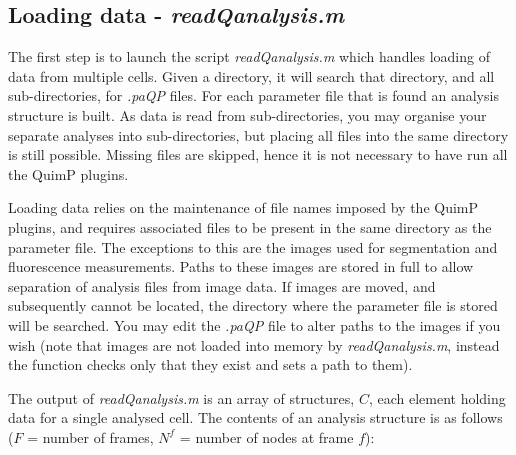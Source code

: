 \documentclass[a4paper,12pt]{article}
\begin{document}
\subsection{Loading data - \textit{readQanalysis.m}  }

The first step is to launch the script \textit{readQanalysis.m} which handles loading of data from multiple
cells.  Given a directory, it will search that directory, and all sub-directories, for \textit{.paQP} files. For each parameter file
that is found an analysis structure is built.  As data is read from sub-directories, you may organise your separate analyses into 
sub-directories, but placing all files into the same directory is still possible. Missing files are skipped, hence it is not necessary
to have run all the QuimP plugins.


Loading data relies on the maintenance
of file names imposed by the QuimP plugins, and requires associated files to
be present in the same directory as the parameter file.
The exceptions to this are the images used for segmentation and fluorescence measurements.  Paths to these images are
stored in full to allow separation of analysis files from image data.  If images are moved, and subsequently cannot
be located, the directory where the parameter file is stored will be searched.  You may edit the \textit{.paQP} file to alter
paths to the images if you wish
(note that images are not loaded into memory by \textit{readQanalysis.m}, instead the function checks only that they exist
and sets a path to them).

The output of \textit{readQanalysis.m} is an array of structures, $C$, each element holding data for a single analysed cell.
The contents of an analysis structure is as follows ($F$ = number of frames, $N^{f}$ = number of nodes at frame $f$):
\end{document}
